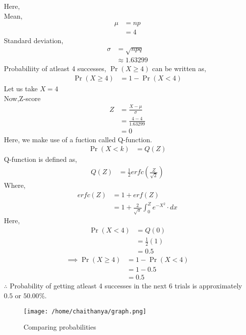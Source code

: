 \documentclass[journal,12pt,onecolumn]{article}
\providecommand{\pr}[1]{\ensuremath{\Pr\left(#1\right)}}
\theoremstyle{remark}
\begin{document}
\begin{enumerate}
		Here, \\ Mean, 
\begin{align}
\mu &= np\\
 &= 4
\end{align}
Standard deviation, 
\begin{align}
\sigma &= \sqrt{npq}\\
&\approx 1.63299
\end{align}
Probabiliity of atleast 4 successes, $\pr{X\geq4}$ can be written as,
\begin{align}
\pr{X\geq4} &= 1-\pr{X<4}
\end{align} 
Let us take $X = 4$\\
Now,Z-score
\begin{align}
Z &= \frac{X - \mu}{\sigma} \\
 &= \frac{4-4}{1.63299} \\
 &= 0
\end{align}
Here, we make use of a fuction called Q-function.
		\begin{align}
			\pr{X<k} &= Q(Z)
		\end{align}
		Q-function is defined as, 
		\begin{align}
			Q(Z) &= \frac{1}{2} erfc \left(\frac{Z}{\sqrt 2}\right)
		\end{align}
		Where,
		\begin{align}
			erfc(Z) &= 1 + erf(Z)\\
			&= 1 + \frac{2}{\sqrt \pi}\int_{0}^{Z}e^{-X^2}\cdot dx
		\end{align}
Here,			
\begin{align}
	\pr{X<4} &= Q(0)\\
	&= \frac{1}{2} (1)\\
	&= 0.5
\end{align}
\begin{align}
\implies \pr{X\geq4} &= 1-\pr{X<4}\\
	&= 1- 0.5\\
	&= 0.5
\end{align}
$\therefore$ Probability of getting atleast 4 successes in the next 6 trials is approximately $0.5$ or $50.00\%$. 
\begin{figure}[H]
  \centering
  \texttt{[image: /home/chaithanya/graph.png]}
  \caption{Comparing probabilities}
  \label{Binomial vs Gaussian}
\end{figure}
\end{enumerate}
\end{document}

